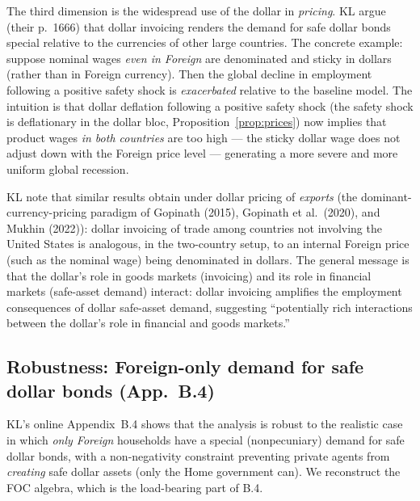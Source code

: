 The third dimension is the widespread use of the dollar in \emph{pricing}. KL
argue (their p.~1666) that dollar invoicing renders the demand for safe dollar
bonds special relative to the currencies of other large countries. The concrete
example: suppose nominal wages \emph{even in Foreign} are denominated and sticky in
dollars (rather than in Foreign currency). Then the global decline in employment
following a positive safety shock is \emph{exacerbated} relative to the baseline
model. The intuition is that dollar deflation following a positive safety shock
(the safety shock is deflationary in the dollar bloc,
Proposition~\ref{prop:prices}) now implies that product wages \emph{in both
countries} are too high --- the sticky dollar wage does not adjust down with the
Foreign price level --- generating a more severe and more uniform global recession.

KL note that similar results obtain under dollar pricing of \emph{exports} (the
dominant-currency-pricing paradigm of Gopinath (2015), Gopinath et al.\ (2020),
and Mukhin (2022)): dollar invoicing of trade among countries not involving the
United States is analogous, in the two-country setup, to an internal Foreign price
(such as the nominal wage) being denominated in dollars. The general message is
that the dollar's role in goods markets (invoicing) and its role in financial
markets (safe-asset demand) interact: dollar invoicing amplifies the employment
consequences of dollar safe-asset demand, suggesting ``potentially rich
interactions between the dollar's role in financial and goods markets.''

\subsection{Robustness: Foreign-only demand for safe dollar bonds (App.~B.4)}
\label{sec:foreign-only}

KL's online Appendix~B.4 shows that the analysis is robust to the realistic case
in which \emph{only Foreign} households have a special (nonpecuniary) demand for
safe dollar bonds, with a non-negativity constraint preventing private agents from
\emph{creating} safe dollar assets (only the Home government can). We reconstruct
the FOC algebra, which is the load-bearing part of B.4.

